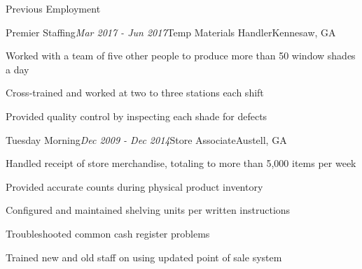 \begin{rSection}{Previous Employment}

\begin{rSubsection}{Premier Staffing}{\em Mar 2017 - Jun 2017}{Temp Materials Handler}{Kennesaw, GA}
\item Worked with a team of five other people to produce more than 50 window shades a day
\item Cross-trained and worked at two to three stations each shift
\item Provided quality control by inspecting each shade for defects
\end{rSubsection}

\begin{rSubsection}{Tuesday Morning}{\em Dec 2009 - Dec 2014}{Store Associate}{Austell, GA}
\item Handled receipt of store merchandise, totaling to more than 5,000 items per week
\item Provided accurate counts during physical product inventory
\item Configured and maintained shelving units per written instructions
\item Troubleshooted common cash register problems
\item Trained new and old staff on using updated point of sale system
\end{rSubsection}

\end{rSection}